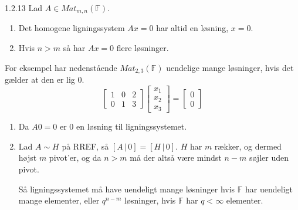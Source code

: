 \begin{korollar}{1.2.13}
	Lad $A \in Mat_{m,n}(\mathbb{F})$.
	\begin{enumerate}
		\item Det homogene ligningssystem $Ax = 0$ har altid en løsning, 
			$x = 0$.
		\item Hvis $n > m$ så har $Ax = 0$ flere løsninger.
	\end{enumerate}
\end{korollar}
For eksempel har nedenstående $Mat_{2,3}(\mathbb{F})$ uendelige mange 
løsninger, hvis det gælder at den er lig $0$.
\[ 
	\begin{bmatrix}
		1 & 0 & 2 \\
		0 & 1 & 3
	\end{bmatrix}
	\begin{bmatrix}
		x_1 \\ 
		x_2 \\
		x_3 
	\end{bmatrix}
	=
	\begin{bmatrix}
		0 \\ 
		0 
	\end{bmatrix}
\] 
\begin{bevis}
	\begin{enumerate}
		\item Da $A0 = 0$ er $0$ en løsning til ligningssystemet.
		\item Lad $A \sim H$ på RREF, så $[A\,|\,0] = [H\,|\,0]$. $H$ har $m$
			rækker, og dermed højst $m$ pivot'er, og da $n > m$ må der altså
			være mindst $n-m$ søjler uden pivot. 
			
			Så ligningssystemet må have
			uendeligt mange løsninger hvis $\mathbb{F}$ har uendeligt mange
			elementer, eller $q^{n-m}$ løsninger, hvis $\mathbb{F}$ har $q <
			\infty$ elementer.
	\end{enumerate}
\end{bevis}
